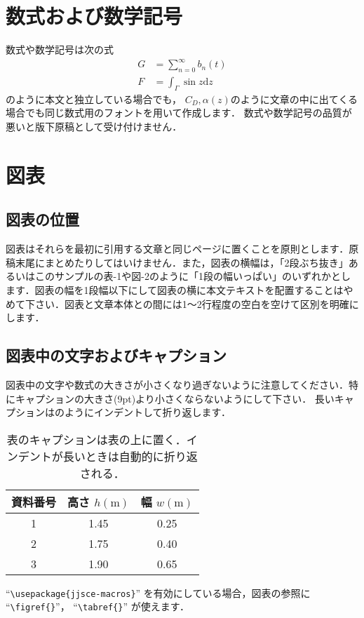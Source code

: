 \documentclass{jjsce}
\begin{document}
\section{数式および数学記号}
数式や数学記号は次の式
\begin{align}
G&=\sum_{n=0}^\infty b_n(t)\\
F&=\int_{\Gamma}\sin z \mathrm{d}z
\end{align}
のように本文と独立している場合でも，
$C_D, \alpha(z)$のように文章の中に出てくる場合でも同じ数式用のフォントを用いて作成します．
数式や数学記号の品質が悪いと版下原稿として受け付けません．
\section{図表}
\subsection{図表の位置}
図表はそれらを最初に引用する文章と同じページに置くことを原則とします．原稿末尾にまとめたりしてはいけません．また，図表の横幅は，「2段ぶち抜き」あるいはこのサンプルの表-1や図-2のように「1段の幅いっぱい」のいずれかとします．図表の幅を1段幅以下にして図表の横に本文テキストを配置することはやめて下さい．図表と文章本体との間には1～2行程度の空白を空けて区別を明確にします．

\subsection{図表中の文字およびキャプション}
図表中の文字や数式の大きさが小さくなり過ぎないように注意してください．特にキャプションの大きさ(9pt)より小さくならないようにして下さい．
長いキャプションはのようにインデントして折り返します．


\begin{table}[htb]
\caption{表のキャプションは表の上に置く．インデントが長いときは自動的に折り返される．}
\label{tab:sample}
\centering
\begin{tabular}{|c|c|c|}\hline
資料番号 & 高さ $h(\mathrm{m})$ &幅 $w(\mathrm{m})$ \\\hline
1 & 1.45 & 0.25\\
2 & 1.75 & 0.40\\
3 & 1.90 & 0.65\\\hline
\end{tabular}
\end{table}

``\verb|\usepackage{jjsce-macros}|''
を有効にしている場合，図表の参照に
``\verb|\figref{}|''，
``\verb|\tabref{}|''
が使えます．
\end{document}
